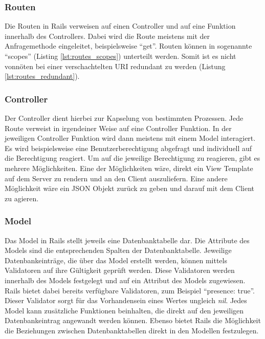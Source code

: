 \subsubsection{Routen}
\label{sec: routen}
Die Routen in Rails verweisen auf einen Controller und auf eine Funktion innerhalb des Controllers. Dabei wird die Route meistens mit der Anfragemethode eingeleitet, beispielsweise \enquote{get}. Routen können in sogenannte \enquote{scopes} (Listing \ref{lst:routes_scopes}) unterteilt werden. Somit ist es nicht vonnöten bei einer verschachtelten \gls{URI} redundant zu werden (Listung \ref{lst:routes_redundant}).

\begin{minipage}{\linewidth}
	
\end{minipage}

\begin{minipage}{\linewidth}
	
\end{minipage}

\subsubsection{Controller}
\label{sec: rails_controller}
Der Controller dient hierbei zur Kapselung von bestimmten Prozessen. Jede Route verweist in irgendeiner Weise auf eine Controller Funktion. In der jeweiligen Controller Funktion wird dann meistens mit einem Model interagiert. Es wird beispielsweise eine Benutzerberechtigung abgefragt und individuell auf die Berechtigung reagiert. Um auf die jeweilige Berechtigung zu reagieren, gibt es mehrere Möglichkeiten. Eine der Möglichkeiten wäre, direkt ein View Template auf dem Server zu rendern und an den Client auszuliefern. Eine andere Möglichkeit wäre ein \gls{JSON} Objekt zurück zu geben und darauf mit dem Client zu agieren.

\subsubsection{Model}
\label{sec: rails_model}
Das Model in Rails stellt jeweils eine Datenbanktabelle dar. Die Attribute des Models sind die entsprechenden Spalten der Datenbanktabelle. Jeweilige Datenbankeinträge, die über das Model erstellt werden, können mittels Validatoren auf ihre Gültigkeit geprüft werden. Diese Validatoren werden innerhalb des Models festgelegt und auf ein Attribut des Models zugewiesen. Rails bietet dabei bereits verfügbare Validatoren, zum Beispiel \enquote{presence: true}. Dieser Validator sorgt für das Vorhandensein eines Wertes ungleich \textit{nil}. Jedes Model kann zusätzliche Funktionen beinhalten, die direkt auf den jeweiligen Datenbankeintrag angewandt werden können. Ebenso bietet Rails die Möglichkeit die Beziehungen zwischen Datenbanktabellen direkt in den Modellen festzulegen.

